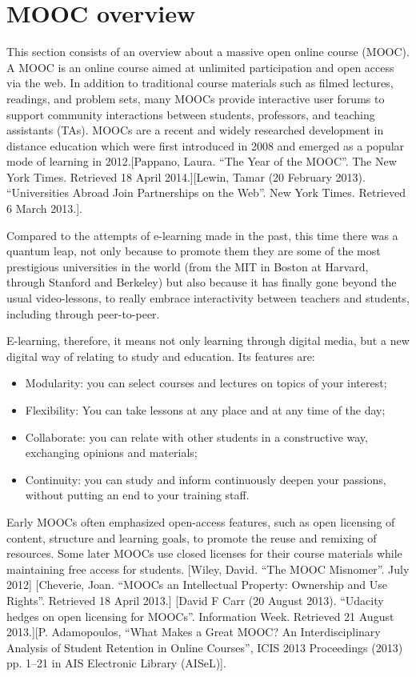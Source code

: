 \section{MOOC overview}
\label{sec:mooc_overview}

This section consists of an overview about a massive open online course (MOOC). A MOOC is an online course aimed at unlimited participation and open access via the web. In addition to traditional course materials such as filmed lectures, readings, and problem sets, many MOOCs provide interactive user forums to support community interactions between students, professors, and teaching assistants (TAs). MOOCs are a recent and widely researched development in distance education which were first introduced in 2008 and emerged as a popular mode of learning in 2012.[Pappano, Laura. “The Year of the MOOC”. The New York Times. Retrieved 18 April 2014.][Lewin, Tamar (20 February 2013). “Universities Abroad Join Partnerships on the Web”. New York Times. Retrieved 6 March 2013.]. 

Compared to the attempts of e-learning made in the past, this time there was a quantum leap, not only because to promote them they are some of the most prestigious universities in the world (from the MIT in Boston at Harvard, through Stanford and Berkeley) but also because it has finally gone beyond the usual video-lessons, to really embrace interactivity between teachers and students, including through peer-to-peer.

E-learning, therefore, it means not only learning through digital media, but a new digital way of relating to study and education.
Its features are:
\begin{itemize}
\item Modularity: you can select courses and lectures on topics of your interest;
\item Flexibility: You can take lessons at any place and at any time of the day;
\item Collaborate: you can relate with other students in a constructive way, exchanging opinions and materials;
\item Continuity: you can study and inform continuously deepen your passions, without putting an end to your training staff.
\end{itemize}


%
Early MOOCs often emphasized open-access features, such as open licensing of content, structure and learning goals, to promote the reuse and remixing of resources. Some later MOOCs use closed licenses for their course materials while maintaining free access for students.  [Wiley, David. “The MOOC Misnomer”. July 2012] [Cheverie, Joan. “MOOCs an Intellectual Property: Ownership and Use Rights”. Retrieved 18 April 2013.] [David F Carr (20 August 2013). “Udacity hedges on open licensing for MOOCs”. Information Week. Retrieved 21 August 2013.][P. Adamopoulos, “What Makes a Great MOOC? An Interdisciplinary Analysis of Student Retention in Online Courses”, ICIS 2013 Proceedings (2013) pp. 1–21 in AIS Electronic Library (AISeL)].
%

